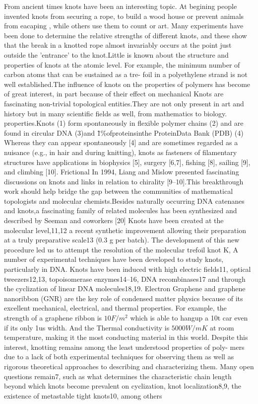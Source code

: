 \documentclass[%
 reprint,
 amsmath,amssymb,
 aps,
prb,
]{revtex4-1}
\begin{document}
From ancient times knots have been an interesting topic. At begining people invented knots from securing a rope, to build a wood house or prevent animals from eacaping , while others use them to count or art\cite{Adams1995}.
\cite{DietrichBuchecker1989}
Many experiments have been done to determine the relative strengths of different knots, and these show that the break in a knotted rope almost invariably occurs at the point just outside the 'entrance' to the knot.Little is known about the structure and properties of
knots at the atomic level. For example, the minimum number of carbon atoms that can be sustained as a tre- foil in a polyethylene strand is not well established.The influence of knots on
the properties of polymers has become of great interest, in part because of their effect on mechanical Knots are fascinating non-trivial topological entities.They are not only present in art and history but in many scientific fields as well, from mathematics to biology.
properties.Knots (1) form spontaneously in flexible  polymer chains (2) and are found in circular DNA (3)and \~1\%ofproteinsinthe ProteinData Bank (PDB) (4)
Whereas they can appear spontaneously [4] and are sometimes regarded as a nuisance (e.g., in hair and during knitting), knots as fasteners of filamentary structures have applications in biophysics [5], surgery [6,7], fishing [8], sailing [9], and climbing [10]. Frictional
In 1994, Liang and Mislow presented fascinating discussions on knots and
links in relation to chirality [9–10].This breakthrough work should help bridge the gap between the communities of mathematical topologists and molecular chemists.Besides naturally occurring DNA catenanes and knots,a fascinating family of
related molecules has been synthesized and described by Seeman and coworkers [20]
Knots have been created at the molecular level,11,12 a recent synthetic improvement allowing their preparation at a truly
preparative scale13 (0.3 g per batch). The development of this new procedure led us to attempt the resolution of the molecular trefoil knot K,
A number of experimental techniques have been developed
to study knots, particularly in DNA. Knots have been induced with high electric fields11, optical tweezers12,13, topoisomerase enzymes14–16, DNA recombinases17 and through the cyclization of linear DNA molecules18,19. Electron
Graphene and graphene nanoribbon (GNR) are the key role of condensed matter physics because of its excellent mechanical, electrical, and thermal properties. For example, the strength of a graphene ribbon is $10F/m^2$ which is able to hangup a 10t car even if its only 1us width. And the Thermal conductivity is $5000W/mK$ at room temperature, making it the most conducting material in this world.
Despite this interest, knotting remains among the least understood properties of poly- mers due to a lack of both experimental techniques for observing them as well as rigorous theoretical approaches to describing and characterizing them. Many open questions remain7, such as what determines the characteristic chain length beyond which knots become prevalent on cyclization, knot localization8,9, the existence of metastable tight knots10, among others
\end{document}
